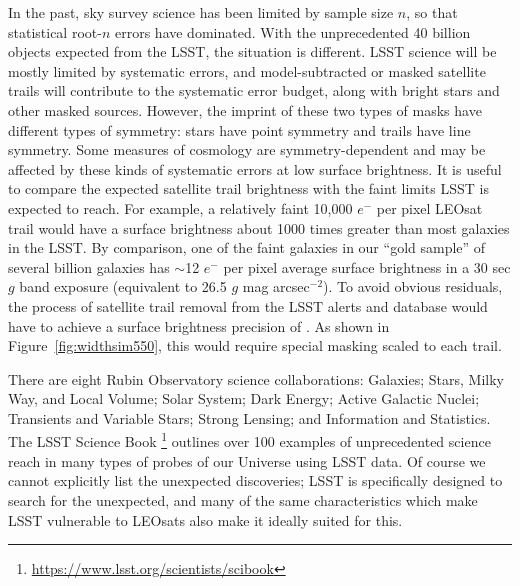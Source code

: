 \documentclass[twocolumn,trackchanges]{aastex63}
\begin{document}
In the past, sky survey science has been limited by sample size $n$, so that statistical root-$n$ errors have dominated. With the unprecedented 40 billion objects expected from the LSST, the situation is different. LSST science will be mostly limited by systematic errors, and model-subtracted or masked satellite trails will contribute to the systematic error budget, along with bright stars and other masked sources.
However, the imprint of these two types of masks have different types of symmetry: stars have point symmetry and trails have line symmetry. Some measures of cosmology are symmetry-dependent and may be affected by these kinds of systematic errors at low surface brightness.  It is useful to compare the expected satellite trail brightness with the faint limits LSST is expected to reach.
For example, a relatively faint 10,000 $e^-$ per pixel LEOsat trail would have a surface brightness about 1000 times greater than most galaxies in the LSST. By comparison, one of the faint galaxies in our ``gold sample'' of several billion galaxies has $\sim$12 $e^-$ per pixel average surface brightness in a 30 sec $g$ band exposure (equivalent to 26.5 $g$ mag arcsec$^{-2}$).    To avoid obvious residuals, the process of satellite trail removal from the LSST alerts and database would have to achieve a surface brightness precision of . As shown in Figure~\ref{fig:widthsim550}, this would require special masking scaled to each trail.


There are eight Rubin Observatory science collaborations: Galaxies; Stars, Milky Way, and Local Volume; Solar System; Dark Energy; Active Galactic Nuclei; Transients and Variable Stars; Strong Lensing; and Information and Statistics. 
The LSST Science Book \citep{scibook}\footnote{\url{https://www.lsst.org/scientists/scibook}} outlines over 100 examples of unprecedented science reach in many types of probes of our Universe using LSST data. Of course we cannot explicitly list the unexpected discoveries; LSST is specifically designed to search for the unexpected, and many of the same characteristics which make LSST vulnerable to LEOsats also make it ideally suited for this.
\end{document}
